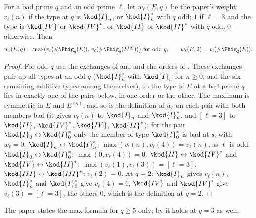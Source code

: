 \begin{proposition}\label{prop:reduction:twist-weight}
For a bad prime $q$ and an odd prime $\ell$, let $w_\ell(E,q)$ be the paper's weight: $v_\ell(n)$ if the type at $q$ is $\kod{I}_n$, or
$\kod{I}_n^*$ with $q$ odd; $1$ if $\ell=3$ and the type is $\kod{IV}$ or $\kod{IV}^*$, or $\kod{II}$ or $\kod{II}^*$ with $q$ odd; $0$ otherwise.
Then
\[
w_\ell(E,q)=\max\bigl(v_\ell(\#\Phig_q(E)),\,v_\ell(\#\Phig_q(E^{(q)}))\bigr)\ \text{for odd }q,\qquad w_\ell(E,2)=v_\ell(\#\Phig_2(E)).
\]
\end{proposition}

\begin{proof}
For odd $q$ use the exchanges of  and  and the orders of
. These exchanges pair up all types at an odd $q$ ($\kod{I}_n^*$ with $\kod{I}_n$ for $n\ge0$, and the six remaining
additive types among themselves), so the type of $E$ at a bad prime $q$ lies in exactly one of the pairs below, in one order or the
other. The maximum is symmetric in $E$ and $E^{(q)}$, and so is the definition of $w_\ell$ on each pair with both members bad (it
gives $v_\ell(n)$ to $\kod{I}_n$ and $\kod{I}_n^*$, and $[\ell=3]$ to $\kod{II}$, $\kod{IV}^*$, $\kod{IV}$, $\kod{II}^*$); for the pair
$\kod{I}_0\leftrightarrow\kod{I}_0^*$ only the member of type $\kod{I}_0^*$ is bad at $q$, with $w_\ell=0$. $\kod{I}_n\leftrightarrow\kod{I}_n^*$: $\max(v_\ell(n),v_\ell(4))=v_\ell(n)$, as $\ell$ is odd.
$\kod{I}_0\leftrightarrow\kod{I}_0^*$: $\max(0,v_\ell(4))=0$. $\kod{II}\leftrightarrow\kod{IV}^*$ and $\kod{IV}\leftrightarrow\kod{II}^*$:
$\max(v_\ell(1),v_\ell(3))=[\ell=3]$. $\kod{III}\leftrightarrow\kod{III}^*$: $v_\ell(2)=0$. At $q=2$: $\kod{I}_n$ gives $v_\ell(n)$,
$\kod{I}_n^*$ and $\kod{I}_0^*$ give $v_\ell(4)=0$, $\kod{IV}$ and $\kod{IV}^*$ give $v_\ell(3)=[\ell=3]$, the others $0$, which is the definition at
$q=2$.
\end{proof}

The paper states the max formula for $q\ge5$ only; by  it holds at $q=3$ as well.

